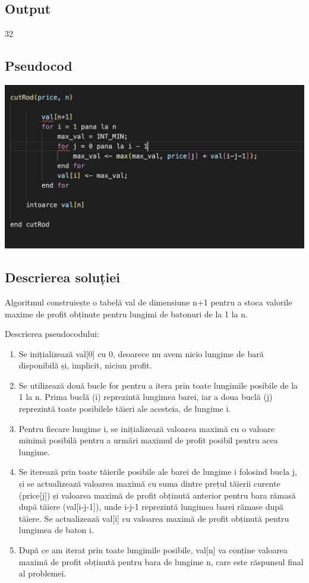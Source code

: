 \documentclass[runningheads]{llncs}
\begin{document}
\subsection{Output}
32
\subsection{Pseudocod}
\begin{center}
    \includegraphics[scale=0.5]{p6.png}
\end{center}
\subsection{Descrierea soluției}
Algoritmul construiește o tabelă val de dimensiune n+1 pentru a stoca valorile maxime de profit obținute pentru lungimi de batonuri de la 1 la n.\newline

Descrierea pseudocodului: \newline
\begin{enumerate}
    \item Se inițializează val[0] cu 0, deoarece nu avem nicio lungime de bară disponibilă și, implicit, niciun profit.
    \item Se utilizează două bucle for pentru a itera prin toate lungimile posibile de la 1 la n. Prima buclă (i) reprezintă lungimea barei, iar a doua buclă (j) reprezintă toate posibilele tăieri ale acesteia, de lungime i.
    \item Pentru fiecare lungime i, se inițializează valoarea maximă cu o valoare minimă posibilă  pentru a urmări maximul de profit posibil pentru acea lungime.
\item Se iterează prin toate tăierile posibile ale barei de lungime i folosind bucla j, și se actualizează valoarea maximă cu suma dintre prețul tăierii curente (price[j]) și valoarea maximă de profit obținută anterior pentru bara rămasă după tăiere (val[i-j-1]), unde i-j-1 reprezintă lungimea barei rămase după tăiere.
Se actualizează val[i] cu valoarea maximă de profit obținută pentru lungimea de baton i.
\item După ce am iterat prin toate lungimile posibile, val[n] va conține valoarea maximă de profit obținută pentru bara de lungime n, care este răspunsul final al problemei.
\end{enumerate}
\end{document}
